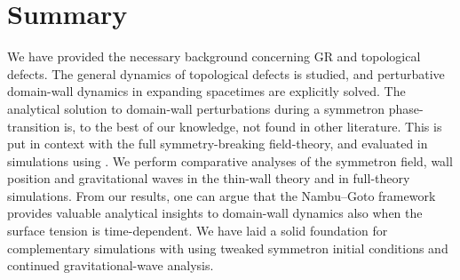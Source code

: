 








\section{Summary}
    We have provided the necessary background concerning GR and topological defects. The general dynamics of topological defects is studied, and perturbative domain-wall dynamics in expanding spacetimes are explicitly solved. The analytical solution to domain-wall perturbations during a symmetron phase-transition is, to the best of our knowledge, not found in other literature. 
    This is put in context with the full symmetry-breaking field-theory, and evaluated in simulations using \asgrd{}. We perform comparative analyses of the symmetron field, wall position and gravitational waves in the thin-wall theory and in full-theory simulations. From our results, one can argue that the Nambu--Goto framework provides valuable analytical insights to domain-wall dynamics also when the surface tension is time-dependent. We have laid a solid foundation for complementary simulations with \asgrd{} using tweaked symmetron initial conditions and continued gravitational-wave analysis.









